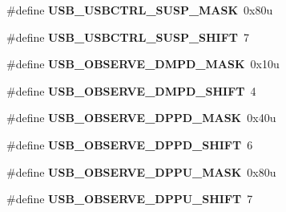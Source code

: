 \begin{DoxyCompactItemize}
\item 
\#define {\bfseries U\+S\+B\+\_\+\+U\+S\+B\+C\+T\+R\+L\+\_\+\+S\+U\+S\+P\+\_\+\+M\+A\+SK}~0x80u\hypertarget{group__USB__Register__Masks_gac65859ca12bfe997afc67545c8b1a052}{}\label{group__USB__Register__Masks_gac65859ca12bfe997afc67545c8b1a052}

\item 
\#define {\bfseries U\+S\+B\+\_\+\+U\+S\+B\+C\+T\+R\+L\+\_\+\+S\+U\+S\+P\+\_\+\+S\+H\+I\+FT}~7\hypertarget{group__USB__Register__Masks_ga44772d68648a57e6341ceec7fd5268f3}{}\label{group__USB__Register__Masks_ga44772d68648a57e6341ceec7fd5268f3}

\item 
\#define {\bfseries U\+S\+B\+\_\+\+O\+B\+S\+E\+R\+V\+E\+\_\+\+D\+M\+P\+D\+\_\+\+M\+A\+SK}~0x10u\hypertarget{group__USB__Register__Masks_ga796850497f75cc88772d3826d1196a43}{}\label{group__USB__Register__Masks_ga796850497f75cc88772d3826d1196a43}

\item 
\#define {\bfseries U\+S\+B\+\_\+\+O\+B\+S\+E\+R\+V\+E\+\_\+\+D\+M\+P\+D\+\_\+\+S\+H\+I\+FT}~4\hypertarget{group__USB__Register__Masks_ga044fcfc292ba6db33ec4e847a6510440}{}\label{group__USB__Register__Masks_ga044fcfc292ba6db33ec4e847a6510440}

\item 
\#define {\bfseries U\+S\+B\+\_\+\+O\+B\+S\+E\+R\+V\+E\+\_\+\+D\+P\+P\+D\+\_\+\+M\+A\+SK}~0x40u\hypertarget{group__USB__Register__Masks_ga8368ad607c0f5a0ab499734e26f36aad}{}\label{group__USB__Register__Masks_ga8368ad607c0f5a0ab499734e26f36aad}

\item 
\#define {\bfseries U\+S\+B\+\_\+\+O\+B\+S\+E\+R\+V\+E\+\_\+\+D\+P\+P\+D\+\_\+\+S\+H\+I\+FT}~6\hypertarget{group__USB__Register__Masks_gaba84f8caae5d942588bd678bbc2ad267}{}\label{group__USB__Register__Masks_gaba84f8caae5d942588bd678bbc2ad267}

\item 
\#define {\bfseries U\+S\+B\+\_\+\+O\+B\+S\+E\+R\+V\+E\+\_\+\+D\+P\+P\+U\+\_\+\+M\+A\+SK}~0x80u\hypertarget{group__USB__Register__Masks_ga04f8b1d77478cb027a79323cef482965}{}\label{group__USB__Register__Masks_ga04f8b1d77478cb027a79323cef482965}

\item 
\#define {\bfseries U\+S\+B\+\_\+\+O\+B\+S\+E\+R\+V\+E\+\_\+\+D\+P\+P\+U\+\_\+\+S\+H\+I\+FT}~7\hypertarget{group__USB__Register__Masks_ga08ff5b00473fda9eb458f3457490eb15}{}\label{group__USB__Register__Masks_ga08ff5b00473fda9eb458f3457490eb15}


\end{DoxyCompactItemize}
